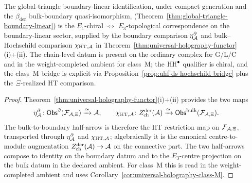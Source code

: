 \begin{proposition}
\label{prop:uhf-global-triangle}
The global-triangle boundary-linear identification, under compact
generation and the $\beta_{\mathrm{der}}$ bulk-boundary
quasi-isomorphism,
(Theorem~\ref{thm:global-triangle-boundary-linear}) is the
$E_1$-chiral $\Leftrightarrow$
$E_3$-topological correspondence on the boundary-linear sector,
supplied by the boundary comparison \(\eta^\partial_{\mathcal{A}}\) and
bulk--Hochschild comparison \(\chi_{\mathrm{HT},\mathcal{A}}\) in
Theorem~\ref{thm:universal-holography-functor}(i)+(ii). The
chain-level datum is present on the ordinary complex for G/L/C and in
the weight-completed ambient for class~M; the $\mathrm{HH}^\bullet$ qualifier
is chiral, and the class~M bridge is explicit via
Proposition~\ref{prop:uhf-ds-hochschild-bridge} plus the
\(\Xi\)-realized HT comparison.
\end{proposition}

\begin{proof}
Theorem~\ref{thm:universal-holography-functor}(i)+(ii) provides the
two maps
\[
 \eta^\partial_{\mathcal{A}}\colon
 \mathsf{Obs}^\partial(\mathcal{F}_{\mathcal{A},\Xi})\xrightarrow{\simeq}\mathcal{A},
 \qquad
 \chi_{\mathrm{HT},\mathcal{A}}\colon
 Z^{\mathrm{der}}_{\mathrm{ch}}(\mathcal{A})\xrightarrow{\simeq}
 \mathsf{Obs}^{\mathrm{bulk}}(\mathcal{F}_{\mathcal{A},\Xi}).
\]
The bulk-to-boundary half-arrow is therefore the HT restriction map
on \(\mathcal{F}_{\mathcal{A},\Xi}\), transported through
\(\eta^\partial_{\mathcal{A}}\) and \(\chi_{\mathrm{HT},\mathcal{A}}\); algebraically it
is the canonical centre-to-module augmentation
\(Z^{\mathrm{der}}_{\mathrm{ch}}(\mathcal{A})\to\mathcal{A}\) on the connective part. The two half-arrows
compose to identity on the boundary datum and to the \(E_3\)-centre
projection on the bulk datum in the declared ambient. For class~M this
is read in the weight-completed ambient and uses
Corollary~\ref*{cor:universal-holography-class-M}.
\end{proof}

